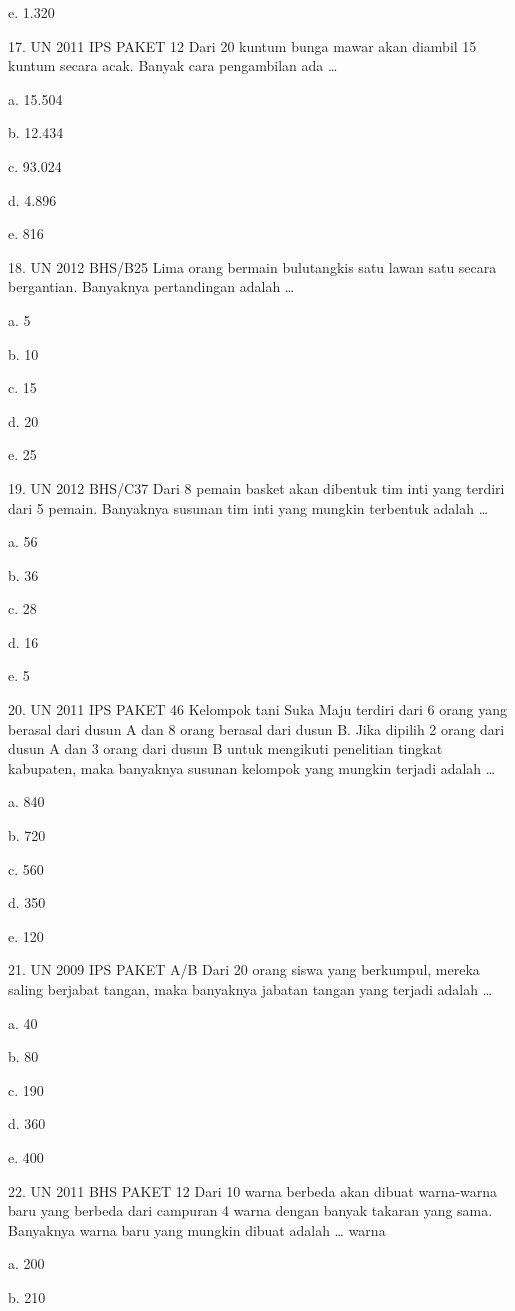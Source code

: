 \documentclass[11pt,fleqn]{book} %
\begin{document}
e.	1.320

17.	UN 2011 IPS PAKET 12 
Dari 20 kuntum bunga mawar akan diambil 15 kuntum secara acak. Banyak cara pengambilan ada …

a.	15.504

b.	12.434

c.	93.024

d.	4.896

e.	816

18.	UN 2012 BHS/B25 
Lima orang bermain bulutangkis satu lawan satu secara bergantian. Banyaknya pertandingan adalah …

a.	5

b.	10

c.	15

d.	20

e.	25

19.	UN 2012 BHS/C37 
Dari 8 pemain basket akan dibentuk tim inti yang terdiri dari 5 pemain. Banyaknya susunan tim inti yang mungkin terbentuk adalah …

a.	56

b.	36

c.	28

d.	16

e.	5

20.	UN 2011 IPS PAKET 46 
Kelompok tani Suka Maju terdiri dari 6 orang yang berasal dari dusun A dan 8 orang berasal dari dusun B. Jika dipilih 2 orang dari dusun A dan 3 orang dari dusun B untuk mengikuti penelitian tingkat kabupaten, maka banyaknya susunan kelompok yang mungkin terjadi adalah …

a.	840

b.	720

c.	560

d.	350

e.	120

21.	UN 2009 IPS PAKET A/B 
Dari 20 orang siswa yang berkumpul, mereka saling berjabat tangan, maka banyaknya jabatan tangan yang terjadi adalah …

a.	40

b.	80


c.	190

d.	360

e.	400

22.	UN 2011 BHS PAKET 12 
Dari 10 warna berbeda akan dibuat warna-warna baru yang berbeda dari campuran 4 warna dengan banyak takaran yang sama. Banyaknya warna baru yang mungkin dibuat adalah … warna

a.	200

b.	210
\end{document}
